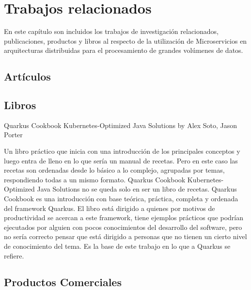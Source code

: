\chapter{Trabajos relacionados}

En este capítulo son incluidos  los trabajos de investigación relacionados, publicaciones, productos y libros al respecto de la utilización de Microservicios en arquitecturas distribuidas para el procesamiento de grandes volúmenes de datos.

\section{Artículos}








\section{Libros}

Quarkus Cookbook Kubernetes-Optimized Java Solutions by Alex Soto, Jason Porter

Un libro práctico que inicia con una introducción de los principales conceptos y luego entra de lleno en lo que sería un manual de recetas. Pero en este caso las recetas son ordenadas desde lo básico a lo complejo, agrupadas por temas, respondiendo todas a un mismo formato. Quarkus Cookbook Kubernetes-Optimized Java Solutions no se queda solo en ser un libro de recetas. Quarkus Cookbook es una introducción con base teórica, práctica, completa y ordenada del framework Quarkus. El libro está dirigido a quienes por motivos de productividad se acercan a este framework, tiene ejemplos prácticos que podrían ejecutados por alguien con pocos conocimientos del desarrollo del software, pero no sería correcto pensar que está dirigido a personas que no tienen un cierto nivel de conocimiento del tema. Es la base de este trabajo en lo que a Quarkus se refiere.
\par



\section{Productos Comerciales}
